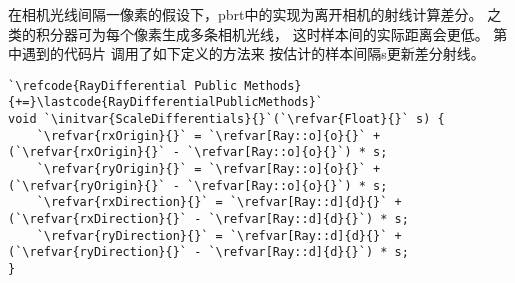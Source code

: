 在相机光线间隔一像素的假设下，pbrt中的实现为离开相机的射线计算差分。
之类的积分器可为每个像素生成多条相机光线，
这时样本间的实际距离会更低。
第中遇到的代码片
调用了如下定义的方法来
按估计的样本间隔{\ttfamily s}更新差分射线。
\begin{lstlisting}
`\refcode{RayDifferential Public Methods}{+=}\lastcode{RayDifferentialPublicMethods}`
void `\initvar{ScaleDifferentials}{}`(`\refvar{Float}{}` s) {
    `\refvar{rxOrigin}{}` = `\refvar[Ray::o]{o}{}` + (`\refvar{rxOrigin}{}` - `\refvar[Ray::o]{o}{}`) * s;
    `\refvar{ryOrigin}{}` = `\refvar[Ray::o]{o}{}` + (`\refvar{ryOrigin}{}` - `\refvar[Ray::o]{o}{}`) * s;
    `\refvar{rxDirection}{}` = `\refvar[Ray::d]{d}{}` + (`\refvar{rxDirection}{}` - `\refvar[Ray::d]{d}{}`) * s;
    `\refvar{ryDirection}{}` = `\refvar[Ray::d]{d}{}` + (`\refvar{ryDirection}{}` - `\refvar[Ray::d]{d}{}`) * s;
}
\end{lstlisting}